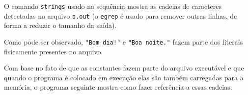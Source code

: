 \documentclass[
  letterpaper,
  DIV=11,
  numbers=noendperiod]{scrartcl}
\newenvironment{Shaded}{\begin{snugshade}}{\end{snugshade}}
\newcommand{\NormalTok}[1]{\textcolor[rgb]{0.00,0.23,0.31}{#1}}
\begin{document}
O comando \texttt{strings} usado na sequência mostra as cadeias de
caracteres detectadas no arquivo \texttt{a.out} (o \texttt{egrep} é
usado para remover outras linhas, de forma a reduzir o tamanho da
saída).

\begin{Shaded}
\end{Shaded}

Como pode ser observado, \texttt{"Bom\ dia!"} e \texttt{"Boa\ noite."}
fazem parte dos literais fisicamente presentes no arquivo.

Com base no fato de que as constantes fazem parte do arquivo executável
e que quando o programa é colocado em execução elas são também
carregadas para a memória, o programa seguinte mostra como fazer
referência a essas cadeias.
\end{document}
